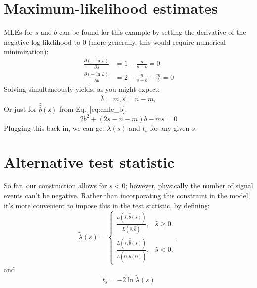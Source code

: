 \section{Maximum-likelihood estimates}

MLEs for $s$ and $b$ can be found for this example by setting the derivative of the negative log-likelihood to 0 (more generally, this would require numerical minimization):
\begin{align}
\label{eq:cmle_b}
\frac{\partial (-\ln L)}{\partial s} &= 1 - \frac{n}{s+b} = 0 \\
\frac{\partial (-\ln L)}{\partial b} &= 2 - \frac{n}{s+b} - \frac{m}{b} = 0
\end{align}
Solving simultaneously yields, as you might expect:
\begin{equation}
\label{eq:mles}
\hat{b} = m, \hat{s} = n - m,
\end{equation}
Or just for $\hat{\hat{b}}(s)$ from Eq.~\ref{eq:cmle_b}:
\begin{equation}
\label{eq:cmle_b_f}
2b^2 + (2s - n - m)b - ms = 0
\end{equation}
Plugging this back in, we can get $\lambda(s)$ and $t_s$ for any given $s$.


\section{Alternative test statistic}

So far, our construction allows for $s < 0$; however, physically the number of signal events can't be negative.
Rather than incorporating this constraint in the model, it's more convenient to impose this in the test statistic, by defining:
\begin{equation}
    \tilde{\lambda}(s) = \left\{
    \begin{array}{ll}
      \frac{L(s, \hat{\hat{b}}(s))}{L(\hat{s}, \hat{b})}, & \mbox{$\hat{s}\geq0$}.\\
      \frac{L(s, \hat{\hat{b}}(s))}{L(\hat{0}, \hat{\hat{b}}(0))}, & \mbox{$\hat{s}<0$}.
    \end{array}
  \right.,
\label{eq:lambda_tilde}
\end{equation}
and
\begin{equation}
    \tilde{t}_s = -2\ln \tilde{\lambda}(s)
\label{eq:t_tilde}
\end{equation}

